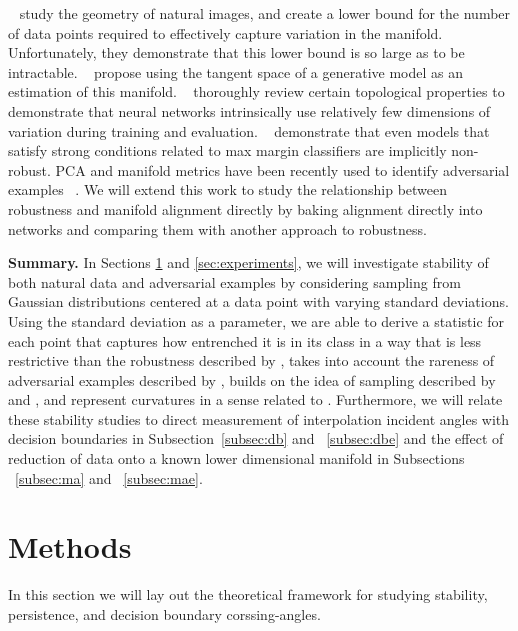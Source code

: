 ~\citet{khoury2018} study the geometry of natural images, and create a
lower bound for the number of data points required to effectively
capture variation in the manifold.
Unfortunately, they demonstrate that this lower bound is so large as to be intractable.
~\citet{shamir2021dimpled} propose using the tangent space of a
generative model as an estimation of this
manifold. ~\citet{magai2022topology} thoroughly review certain
topological properties to demonstrate that neural networks
intrinsically use relatively few dimensions of variation during
training and evaluation. ~\citet{vardi2022gradient} demonstrate that even models that satisfy strong conditions related to max margin classifiers are implicitly non-robust. PCA and manifold metrics have been recently used to identify adversarial examples ~\citep{aparne2022pca, nguyen-minh-luu-2022-textual}. We will extend this work to study the relationship between robustness and manifold alignment directly by baking alignment directly into networks and comparing them with another approach to robustness. 

{\bf Summary.}
 In Sections \ref{sec:meth} and \ref{sec:experiments}, we will investigate stability of both natural data and adversarial examples by considering sampling from Gaussian distributions centered at a data point with varying standard deviations. Using the standard deviation as a parameter, we are able to derive a statistic for each point that captures how entrenched it is in its class in a way that is less restrictive than the robustness described by \citet{khoury2018}, takes into account the rareness of adversarial examples described by \citet{yu2019new}, builds on the idea of sampling described by \citet{roth19aodds} and \citet{hosseini2019odds}, and represent curvatures in a sense related to \citet{Fawzi2018empirical}. Furthermore, we will relate these stability studies to direct measurement of interpolation incident angles with decision boundaries in Subsection~\ref{subsec:db} and ~\ref{subsec:dbe} and the effect of reduction of data onto a known lower dimensional manifold in Subsections ~\ref{subsec:ma} and ~\ref{subsec:mae}.  

\section{Methods} \label{sec:meth} %

In this section we will lay out the theoretical framework for studying stability, persistence, and decision boundary corssing-angles. 

